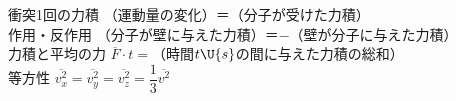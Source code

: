 \begin{key}
\hspace{3mm} 衝突1回の力積\hspace{8mm} （運動量の変化）＝（分子が受けた力積）\\
\hspace{3mm} 作用・反作用\hspace{12mm} （分子が壁に与えた力積）＝$-$（壁が分子に与えた力積）\\
\hspace{3mm} 力積と平均の力\hspace{6mm} $\overline{F}\cdot t=$（時間$t\U{s}$の間に与えた力積の総和）\\
\hspace{3mm} 等方性\hspace{20mm} $\overline{v_x^2}=\overline{v_y^2}=\overline{v_z^2}=\dfrac{1}{3}\overline{v^2}$
\end{key}

